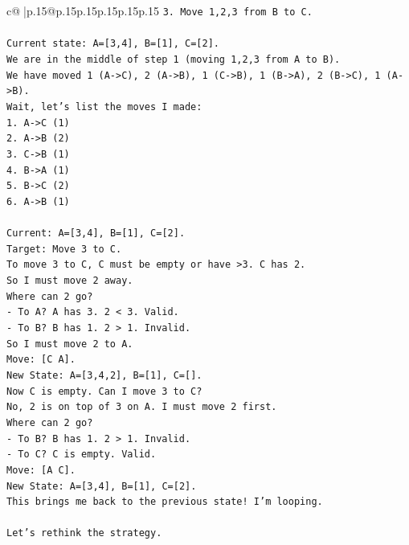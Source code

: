 \documentclass{article}
\begin{document}
{\begin{supertabular}{c@{$\;$}|p{.15\linewidth}@{}p{.15\linewidth}p{.15\linewidth}p{.15\linewidth}p{.15\linewidth}p{.15\linewidth}}
{{{\texttt{3. Move 1,2,3 from B to C.} \\
\\ 
\texttt{Current state: A={[}3,4{]}, B={[}1{]}, C={[}2{]}.} \\
\texttt{We are in the middle of step 1 (moving 1,2,3 from A to B).} \\
\texttt{We have moved 1 (A{-}>C), 2 (A{-}>B), 1 (C{-}>B), 1 (B{-}>A), 2 (B{-}>C), 1 (A{-}>B).} \\
\texttt{Wait, let's list the moves I made:} \\
\texttt{1. A{-}>C (1)} \\
\texttt{2. A{-}>B (2)} \\
\texttt{3. C{-}>B (1)} \\
\texttt{4. B{-}>A (1)} \\
\texttt{5. B{-}>C (2)} \\
\texttt{6. A{-}>B (1)} \\
\\ 
\texttt{Current: A={[}3,4{]}, B={[}1{]}, C={[}2{]}.} \\
\texttt{Target: Move 3 to C.} \\
\texttt{To move 3 to C, C must be empty or have >3. C has 2.} \\
\texttt{So I must move 2 away.} \\
\texttt{Where can 2 go?} \\
\texttt{{-} To A? A has 3. 2 < 3. Valid.} \\
\texttt{{-} To B? B has 1. 2 > 1. Invalid.} \\
\texttt{So I must move 2 to A.} \\
\texttt{Move: {[}C A{]}.} \\
\texttt{New State: A={[}3,4,2{]}, B={[}1{]}, C={[}{]}.} \\
\texttt{Now C is empty. Can I move 3 to C?} \\
\texttt{No, 2 is on top of 3 on A. I must move 2 first.} \\
\texttt{Where can 2 go?} \\
\texttt{{-} To B? B has 1. 2 > 1. Invalid.} \\
\texttt{{-} To C? C is empty. Valid.} \\
\texttt{Move: {[}A C{]}.} \\
\texttt{New State: A={[}3,4{]}, B={[}1{]}, C={[}2{]}.} \\
\texttt{This brings me back to the previous state! I'm looping.} \\
\\ 
\texttt{Let's rethink the strategy.} \\
}}}
\end{supertabular}}
\end{document}
